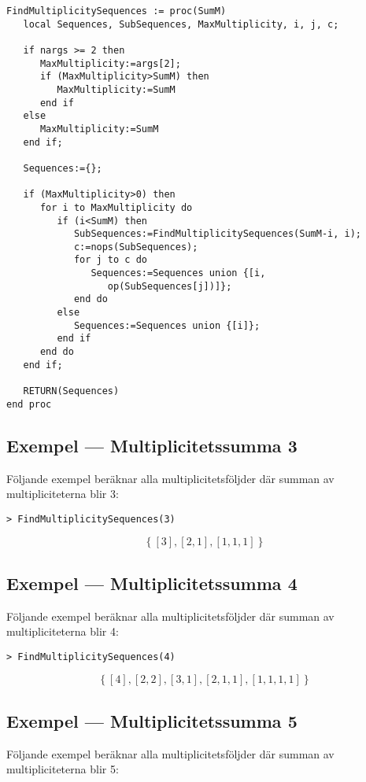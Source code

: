 \begin{verbatim}
FindMultiplicitySequences := proc(SumM)
   local Sequences, SubSequences, MaxMultiplicity, i, j, c;

   if nargs >= 2 then
      MaxMultiplicity:=args[2];
      if (MaxMultiplicity>SumM) then
         MaxMultiplicity:=SumM
      end if
   else
      MaxMultiplicity:=SumM
   end if;

   Sequences:={};

   if (MaxMultiplicity>0) then
      for i to MaxMultiplicity do
         if (i<SumM) then
            SubSequences:=FindMultiplicitySequences(SumM-i, i);
            c:=nops(SubSequences);
            for j to c do
               Sequences:=Sequences union {[i, 
                  op(SubSequences[j])]};
            end do
         else
            Sequences:=Sequences union {[i]};
         end if
      end do
   end if;

   RETURN(Sequences)
end proc
\end{verbatim}

\subsection{Exempel --- Multiplicitetssumma 3}

Följande exempel beräknar alla multiplicitetsföljder där summan av multipliciteterna blir 3:

\begin{verbatim}
> FindMultiplicitySequences(3)
\end{verbatim}
\[\left\{[3], [2,1], [1,1,1]\right\}\]

\subsection{Exempel --- Multiplicitetssumma 4}

Följande exempel beräknar alla multiplicitetsföljder där summan av multipliciteterna blir 4:

\begin{verbatim}
> FindMultiplicitySequences(4)
\end{verbatim}
\[\left\{[4], [2,2], [3,1], [2,1,1], [1,1,1,1]\right\}\]

\subsection{Exempel --- Multiplicitetssumma 5}

Följande exempel beräknar alla multiplicitetsföljder där summan av multipliciteterna blir 5:

